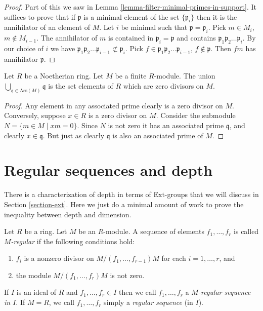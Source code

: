 \begin{proof}
Part of this we saw in Lemma \ref{lemma-filter-minimal-primes-in-support}.
It suffices to prove that if $\mathfrak p$ is a minimal element of
the set $\{\mathfrak p_i\}$ then it is the annihilator of
an element of $M$. Let $i$ be minimal such that
$\mathfrak p = \mathfrak p_i$.
Pick $m \in M_i$, $m \not \in M_{i-1}$. The annihilator of $m$ 
is contained in $\mathfrak p_i = \mathfrak p$ and contains
$\mathfrak p_1 \mathfrak p_2 \ldots \mathfrak p_i$. By our choice of
$i$ we have $\mathfrak p_1 \mathfrak p_2 \ldots \mathfrak p_{i-1}
\not \subset \mathfrak p_i$. Pick
$f \in \mathfrak p_1 \mathfrak p_2 \ldots \mathfrak p_{i-1}$,
$f \not \in \mathfrak p$. Then $fm$ has annihilator $\mathfrak p$.
\end{proof}

\begin{lemma}
\label{lemma-ass-zero-divisors}
Let $R$ be a Noetherian ring.
Let $M$ be a finite $R$-module.
The union $\bigcup_{\mathfrak q \in \text{Ass}(M)} \mathfrak q$
is the set elements of $R$ which are zero divisors on $M$.
\end{lemma}

\begin{proof}
Any element in any associated prime clearly is a zero divisor
on $M$. Conversely, suppose $x \in R$ is a zero divisor on $M$.
Consider the submodule $N = \{m \in M \mid xm = 0\}$.
Since $N$ is not zero it has an associated prime $\mathfrak q$,
and clearly $x \in \mathfrak q$. But just as clearly $\mathfrak q$
is also an associated prime of $M$.
\end{proof}












\section{Regular sequences and depth}
\label{section-depth}

\noindent
There is a characterization of depth in terms of Ext-groups
that we will discuss in Section \ref{section-ext}. Here we just do
a minimal amount of work to prove the inequality between
depth and dimension.

\begin{definition}
\label{definition-regular-sequence}
Let $R$ be a ring.
Let $M$ be an $R$-module. 
A sequence of elements $f_1,\ldots,f_r$ is called {\it $M$-regular}
if the following conditions hold:
\begin{enumerate}
\item $f_i$ is a nonzero divisor on
$M/(f_1,\ldots,f_{r-1})M$
for each $i = 1, \ldots, r$, and
\item the module $M/(f_1,\ldots,f_r)M$ is not zero.
\end{enumerate}
If $I$ is an ideal of $R$ and $f_1,\ldots,f_r \in I$
then we call $f_1,\ldots, f_r$ a {\it $M$-regular sequence
in $I$}. If $M = R$, we call $f_1,\ldots,f_r$ simply a
{\it regular sequence} (in $I$).
\end{definition}

